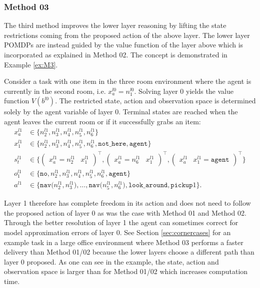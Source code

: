 \subsubsection{Method 03}\label{subsec:M3}
The third method improves the lower layer reasoning by lifting the state restrictions coming from the proposed action of the above layer. The lower layer POMDPs are instead guided by the value function of the layer above which is incorporated as explained in Method 02. The concept is demonstrated in Example \ref{ex:M3}.

\begin{example}\label{ex:M3}
Consider a task with one item in the three room environment where the agent is currently in the second room, i.e. $x_a^{l0}=n_1^{l0}$. Solving layer 0 yields the value function $V(b^{l0})$. The restricted state, action and observation space is determined solely by the agent variable of layer 0. Terminal states are reached when the agent leaves the current room or if it successfully grabs an item:
\begin{equation}
    \begin{aligned}
        x_a^{l1} &\in \big\{ n_2^{l1}, n_3^{l1}, n_4^{l1}, n_5^{l1}, n_6^{l1} \big\} \\
        x_1^{l1} &\in  \big\{ n_2^{l1}, n_3^{l1}, n_4^{l1}, n_5^{l1}, n_6^{l1}, \texttt{not\_here}, \texttt{agent} \big\}\\
         s_t^{l1} &\in \big\{\begin{pmatrix} x_a^{l1}=n_2^{l1} & x_1^{l1} \end{pmatrix}^\intercal, \begin{pmatrix} x_a^{l1}=n_6^{l1} & x_1^{l1} \end{pmatrix}^\intercal,  \begin{pmatrix} x_a^{l1} & x_1^{l1}=\texttt{agent} \end{pmatrix}^\intercal \big\}\\
        o_1^{l1} &\in \big\{\texttt{no}, n_2^{l1}, n_3^{l1}, n_4^{l1}, n_5^{l1}, n_6^{l1}, \texttt{agent} \big\}\\
        a^{l1} &\in \big\{\texttt{nav($n_2^{l1}, n_3^{l1}$)}, \ldots,  \texttt{nav($n_5^{l1}, n_6^{l1}$)}, \texttt{look\_around}, \texttt{pickup}1 \big\}.
    \end{aligned}
\end{equation}
\demo
\end{example}
Layer 1 therefore has complete freedom in its action and does not need to follow the proposed action of layer 0 as was the case with Method 01 and Method 02. Through the better resolution of layer 1 the agent can sometimes correct for model approximation errors of layer 0. See Section \ref{sec:cornercases} for an example task in a large office environment where Method 03 performs a faster delivery than Method 01/02 because the lower layers choose a different path than layer 0 proposed. As one can see in the example, the state, action and observation space is larger than for Method 01/02 which increases computation time.\\

